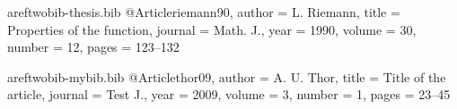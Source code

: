 





\begin{filecontents}{areftwobib-thesis.bib}
@Article{riemann90,
  author =	 {L. Riemann},
  title =	 {Properties of the function},
  journal =	 {Math. J.},
  year =	 1990,
  volume =	 30,
  number =	 12,
  pages =	 {123--132}
}
\end{filecontents}

\begin{filecontents}{areftwobib-mybib.bib}
@Article{thor09,
  author =	 {A. U. Thor},
  title =	 {Title of the article},
  journal =	 {Test J.},
  year =	 2009,
  volume =	 3,
  number =	 1,
  pages =	 {23--45}
}
\end{filecontents}


\documentclass{vakaref}

\usepackage[T2A]{fontenc}
\usepackage[cp1251]{inputenc}
\usepackage[ukrainian]{babel}
\usepackage{amsmath}


